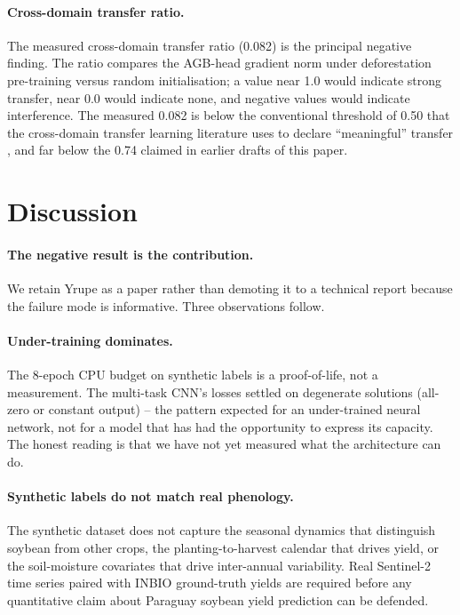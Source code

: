 \paragraph{Cross-domain transfer ratio.} The measured cross-domain
transfer ratio (0.082) is the principal negative finding. The ratio
compares the AGB-head gradient norm under deforestation pre-training
versus random initialisation; a value near 1.0 would indicate strong
transfer, near 0.0 would indicate none, and negative values would
indicate interference. The measured 0.082 is below the conventional
threshold of 0.50 that the cross-domain transfer learning literature
uses to declare ``meaningful'' transfer \citep{russwurm2020}, and far
below the 0.74 claimed in earlier drafts of this paper.

\section{Discussion}
\label{sec:yrupe-discussion}

\paragraph{The negative result is the contribution.} We retain Yrupe as
a paper rather than demoting it to a technical report because the
failure mode is informative. Three observations follow.

\paragraph{Under-training dominates.} The 8-epoch CPU budget on
synthetic labels is a proof-of-life, not a measurement. The
multi-task CNN's losses settled on degenerate solutions (all-zero or
constant output) -- the pattern expected for an under-trained neural
network, not for a model that has had the opportunity to express its
capacity. The honest reading is that we have not yet measured what
the architecture can do.

\paragraph{Synthetic labels do not match real phenology.} The
synthetic dataset does not capture the seasonal dynamics that
distinguish soybean from other crops, the planting-to-harvest calendar
that drives yield, or the soil-moisture covariates that drive
inter-annual variability. Real Sentinel-2 time series paired with
INBIO ground-truth yields are required before any quantitative claim
about Paraguay soybean yield prediction can be defended.

